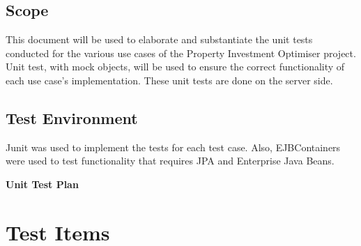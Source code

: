 \documentclass[a4paper,12pt]{article}
\begin{document}
\subsection{Scope}
This document will be used to elaborate and substantiate the unit tests conducted for the various use
cases of the Property Investment Optimiser project. Unit test, with mock objects, will be used to ensure the correct functionality of each use case's implementation. These unit tests are done on the server side.

\subsection{Test Environment}
Junit was used to implement the tests for each test case. Also, EJBContainers were used to test functionality that requires JPA and Enterprise Java Beans.


\newpage
\begin{center}
{\huge \bfseries Unit Test Plan}\\[0.5cm]
\end{center}
\section{Test Items}
\end{document}
